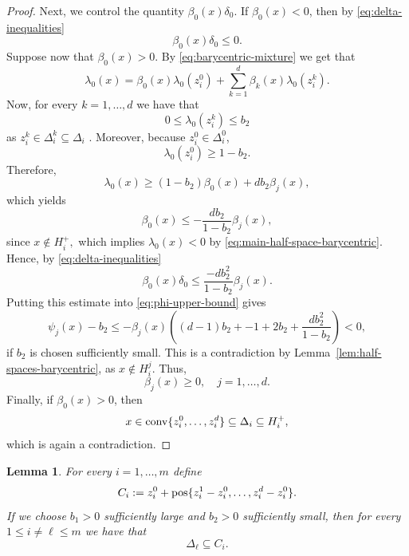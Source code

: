 \documentclass[10pt]{amsart}
\newcommand{\1}{\textbf{1}}
\newcommand{\conv}{{\rm conv}}
\newcommand{\pos}{{\rm pos}}
\numberwithin{equation}{section} %
\newtheorem{lemma}[theorem]{Lemma}
\theoremstyle{remark}
\theoremstyle{definition}
\begin{document}
\begin{proof}
Next, we control the quantity $\beta_0(x)\delta_0$. If $\beta_0(x)<0$, then by \eqref{eq:delta-inequalities} \[\beta_0(x)\delta_0 \leq 0.\] Suppose now that $\beta_0(x)>0$. By \eqref{eq:barycentric-mixture} we get that \[\lambda_0(x)=\beta_0(x)\lambda_0(z_i^0)+ \sum_{k=1}^d \beta_k(x)\lambda_0(z_i^k).\] Now, for every $k=1,\ldots,d$ we have that \[0 \leq\lambda_0(z_i^k) \leq b_2\] as $z_i^k \in \Delta_i^k\subseteq \Delta_i$ . Moreover, because $z_i^0 \in \Delta_i^0$,  \[\lambda_0(z_i^0) \geq 1-b_2.\] Therefore,
\[\lambda_0(x) \geq (1-b_2)\beta_0(x)+db_2\beta_j(x),\] which yields \[\beta_0(x) \leq-\frac{db_2}{1-b_2}\beta_j(x),\] since $x  \notin H_i^+,$ which implies $\lambda_0(x)<0$ by \eqref{eq:main-half-space-barycentric}. Hence, by \eqref{eq:delta-inequalities} \[\beta_0(x)\delta_0 \leq \frac{-db_2^2}{1-b_2}\beta_j(x).\] Putting this estimate into \eqref{eq:phi-upper-bound} gives \[\psi_j(x)-b_2\leq -\beta_j(x)\left((d-1)b_2+-1+2b_2+\frac{db_2^2}{1-b_2}\right)<0,\] if $b_2$ is chosen sufficiently small. This is a contradiction by Lemma~\ref{lem:half-spaces-barycentric}, as $x \notin H_i^j$. Thus, \[\beta_j(x) \geq 0, \quad j=1,\ldots,d.\] Finally, if $\beta_0(x)>0$, then \[x \in \conv\{z_i^0,\ldots,z_i^d\} \subseteq \Delta_i \subseteq H_i^+,\] which is again a contradiction.
\end{proof}

\begin{lemma}\label{lem:geometric-small-c}
For every $i=1,\ldots,m$ define
\[
C_i:=z_i^0+\pos
\{z_i^1-z_i^0,\ldots,z_i^d-z_i^0\}.
\]
If we choose \(b_1>0\) sufficiently large and  \(b_2>0\) sufficiently small, then for every \(1 \leq i \neq \ell \leq m\) we have that
\[
\Delta_\ell\subseteq C_i.
\]
\end{lemma}
\end{document}
